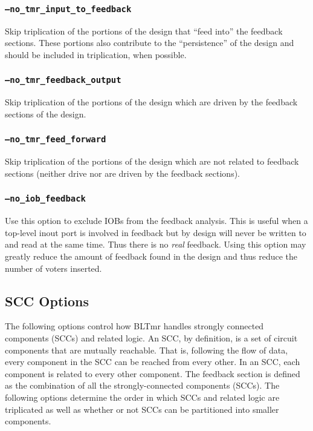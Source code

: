 \subsubsection{\texttt{--no\_tmr\_input\_to\_feedback}}
Skip triplication of the portions of the design that ``feed into'' the feedback 
sections. These portions also contribute to the ``persistence'' of the design 
and should be included in triplication, when possible.

\subsubsection{\texttt{--no\_tmr\_feedback\_output}}
Skip triplication of the portions of the design which are driven by the 
feedback sections of the design.

\subsubsection{\texttt{--no\_tmr\_feed\_forward}}
Skip triplication of the portions of the design which are not related to 
feedback sections (neither drive nor are driven by the feedback sections).

\subsubsection{\texttt{--no\_iob\_feedback}}
Use this option to exclude IOBs from the feedback analysis. This is useful when
a top-level inout port is involved in feedback but by design will never be 
written to and read at the same time. Thus there is no \emph{real} feedback.
Using this option may greatly reduce the amount of feedback found in the design
and thus reduce the number of voters inserted.

\subsection{SCC Options}
The following options control how BLTmr handles strongly connected components 
(SCCs) and related logic. An SCC, by definition, is a set of circuit components 
that are mutually reachable. That is, following the flow of data, every 
component in the SCC can be reached from every other. In an SCC, each component 
is related to every other component. The feedback section is defined as the 
combination of all the strongly-connected components (SCCs). The following 
options determine the order in which SCCs and related logic are triplicated as 
well as whether or not SCCs can be partitioned into smaller components.

